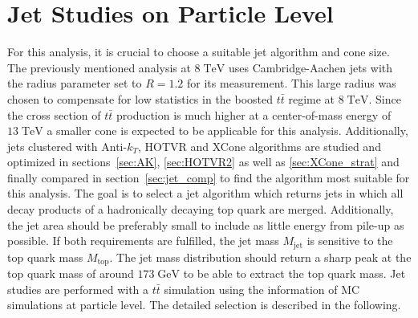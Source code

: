 \section{Jet Studies on Particle Level}
\label{sec:jet_studies}
	For this analysis, it is crucial to choose a suitable jet algorithm and cone size. The previously mentioned analysis at $8\;\text{TeV}$ \cite{torben_paper} uses Cambridge-Aachen jets with the radius parameter set to $R=1.2$ for its measurement. This large radius was chosen to compensate for low statistics in the boosted $t\bar{t}$ regime at $8\;\text{TeV}$. Since the cross section of $t\bar{t}$ production is much higher at a center-of-mass energy of $13\;\text{TeV}$ a smaller cone is expected to be applicable for this analysis. Additionally, jets clustered with Anti-$k_T$, HOTVR and XCone algorithms are studied and optimized in sections~\ref{sec:AK}, \ref{sec:HOTVR2} as well as \ref{sec:XCone_strat} and finally compared in section~\ref{sec:jet_comp} to find the algorithm most suitable for this analysis. The goal is to select a jet algorithm which returns jets in which all decay products of a hadronically decaying top quark are merged. Additionally, the jet area should be preferably small to include as little energy from pile-up as possible. If both requirements are fulfilled, the jet mass $M_\text{jet}$ is sensitive to the top quark mass $M_\text{top}$. The jet mass distribution should return a sharp peak at the top quark mass of around $173\;\text{GeV}$ to be able to extract the top quark mass. Jet studies are performed with a $t\bar{t}$ simulation using the information of MC simulations at particle level. The detailed selection is described in the following.

